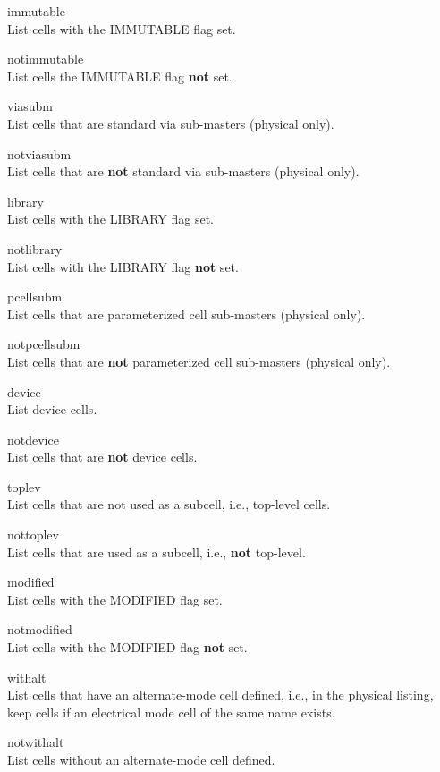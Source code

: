 \begin{description}
\item{\vt immutable}\\
List cells with the IMMUTABLE flag set.
\item{\vt notimmutable}\\
List cells the IMMUTABLE flag {\bf not} set.

\item{\vt viasubm}\\
List cells that are standard via sub-masters (physical only).
\item{\vt notviasubm}\\
List cells that are {\bf not} standard via sub-masters (physical only).

\item{\vt library}\\
List cells with the LIBRARY flag set.
\item{\vt notlibrary}\\
List cells with the LIBRARY flag {\bf not} set.

\item{\vt pcellsubm}\\
List cells that are parameterized cell sub-masters (physical only).
\item{\vt notpcellsubm}\\
List cells that are {\bf not} parameterized cell sub-masters (physical
only).

\item{\vt device}\\
List device cells.
\item{\vt notdevice}\\
List cells that are {\bf not} device cells.

\item{\vt toplev}\\
List cells that are not used as a subcell, i.e., top-level cells.
\item{\vt nottoplev}\\
List cells that are used as a subcell, i.e., {\bf not} top-level.

\item{\vt modified}\\
List cells with the MODIFIED flag set.
\item{\vt notmodified}\\
List cells with the MODIFIED flag {\bf not} set.

\item{\vt withalt}\\
List cells that have an alternate-mode cell defined, i.e., in the
physical listing, keep cells if an electrical mode cell of the
same name exists.
\item{\vt notwithalt}\\
List cells without an alternate-mode cell defined.


\end{description}
